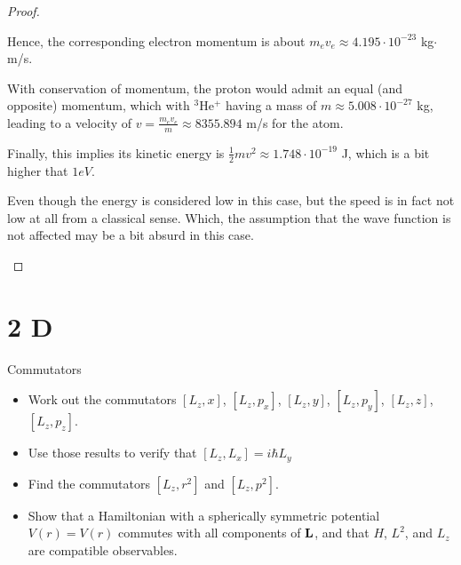 \documentclass{article}
\begin{document}
\begin{proof}
\begin{itemize}
        Hence, the corresponding electron momentum is about $m_ev_e \approx 4.195\cdot 10^{-23}$ kg$\cdot$m/s.

        With conservation of momentum, the proton would admit an equal (and opposite) momentum, which with $^3$He$^+$ having a mass of $m\approx 5.008\cdot 10^{-27}$ kg, leading to a velocity of $v=\frac{m_e v_e}{m}\approx 8355.894$ m/s for the atom.

        Finally, this implies its kinetic energy is $\frac{1}{2}mv^2 \approx 1.748\cdot 10^{-19}$ J, which is a bit higher that $1 eV$.

        Even though the energy is considered low in this case, but the speed is in fact not low at all from a classical sense. Which, the assumption that the wave function is not affected may be a bit absurd in this case.
    \end{itemize}
\end{proof}

\hfil

\section*{2 D}
\begin{ques}\label{q2}
Commutators

\begin{itemize}
\item[(a)] Work out the commutators $[L_z, x]$, $[L_z, p_x]$, $[L_z, y]$, $[L_z, p_y]$, $[L_z, z]$, $[L_z, p_z]$.

\item[(b)] Use those results to verify that $[L_z, L_x] = i\hbar L_y$

\item[(c)] Find the commutators $[L_z, r^2]$ and $[L_z, p^2]$.

\item[(d)] Show that a Hamiltonian with a spherically symmetric potential $V(r) = V(r)$ commutes with all components of $\mathbf{L}$, and that $H$, $L^2$, and $L_z$ are compatible observables.
\end{itemize}
\end{ques}
\end{document}
